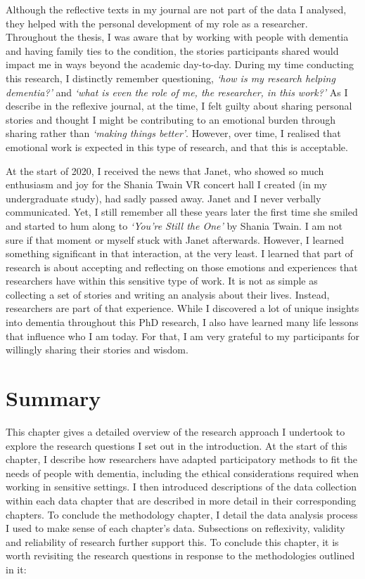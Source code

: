 Although the reflective texts in my journal are not part of the data I analysed, they helped with the personal development of my role as a researcher. Throughout the thesis, I was aware that by working with people with dementia and having family ties to the condition, the stories participants shared would impact me in ways beyond the academic day-to-day. During my time conducting this research, I distinctly remember questioning, \textit{`how is my research helping dementia?'} and \textit{`what is even the role of me, the researcher, in this work?'} As I describe in the reflexive journal, at the time, I felt guilty about sharing personal stories and thought I might be contributing to an emotional burden through sharing rather than \textit{`making things better'}. However, over time, I realised that emotional work is expected in this type of research, and that this is acceptable. 

At the start of 2020, I received the news that Janet, who showed so much enthusiasm and joy for the Shania Twain VR concert hall I created (in my undergraduate study), had sadly passed away. Janet and I never verbally communicated. Yet, I still remember all these years later the first time she smiled and started to hum along to \textit{`You're Still the One'} by Shania Twain. I am not sure if that moment or myself stuck with Janet afterwards. However, I learned something significant in that interaction, at the very least. I learned that part of research is about accepting and reflecting on those emotions and experiences that researchers have within this sensitive type of work. It is not as simple as collecting a set of stories and writing an analysis about their lives. Instead, researchers are part of that experience. While I discovered a lot of unique insights into dementia throughout this PhD research, I also have learned many life lessons that influence who I am today. For that, I am very grateful to my participants for willingly sharing their stories and wisdom.

\section{Summary}
\label{Method:summary}
This chapter gives a detailed overview of the research approach I undertook to explore the research questions I set out in the introduction. At the start of this chapter, I describe how researchers have adapted participatory methods to fit the needs of people with dementia, including the ethical considerations required when working in sensitive settings. I then introduced descriptions of the data collection within each data chapter that are described in more detail in their corresponding chapters. To conclude the methodology chapter, I detail the data analysis process I used to make sense of each chapter's data. Subsections on reflexivity, validity and reliability of research further support this. To conclude this chapter, it is worth revisiting the research questions in response to the methodologies outlined in it:

